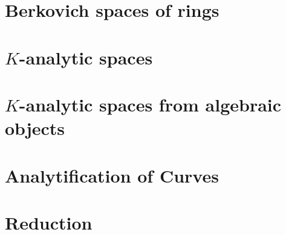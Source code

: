 \documentclass[a4paper]{article}
\begin{document}


\section{Berkovich spaces of rings} \label{sec:berkovich_spaces}



\section{$K$-analytic spaces} \label{sec:K_analytic_spaces}



\section{$K$-analytic spaces from algebraic objects} \label{sec:berkovich_analytification_of_schemes}



\section{Analytification of Curves} \label{sec:analytification_of_curves}



\section{Reduction} \label{sec:reduction}



\pagebreak
\printbibliography
\end{document}
